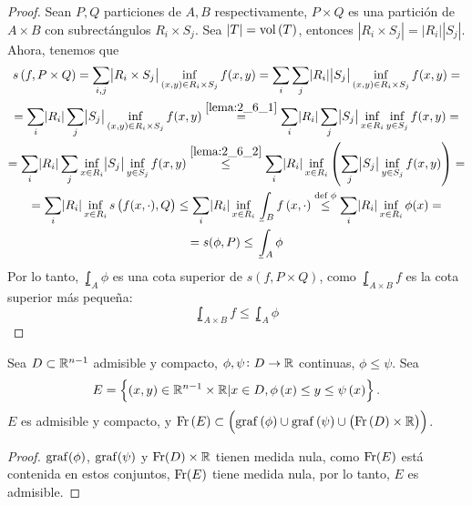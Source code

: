\begin{proof}
    Sean $P, Q$ particiones de $A, B$ respectivamente, $P\times Q$ es una partición de $A\times B$ con subrectángulos $R_i \times S_j$. Sea $|T| = \operatorname{vol}\left( T\right)$, entonces $|R_i\times S_j| = |R_i||S_j|$. Ahora, tenemos que
    \begin{gather*}
        s\left( f, P \times Q \right) = \sum_{i,j} \abs{R_i \times S_j} \inf_{(x, y)
        \in R_i \times S_j} f(x, y) = \sum_i \sum_j \abs{R_i} \abs{S_j} \inf_{(x, y)
        \in R_i \times S_j} f(x, y) =\\= \sum_i \abs{R_i} \sum_j \abs{S_j} \inf_{(x, y)
        \in R_i \times S_j} f(x, y) \stackrel{\ref{lema:2_6_1}}{=} \sum_i \abs{R_i}
        \sum_j \abs{S_j} \inf_{x \in R_i} \inf_{y \in S_j} f(x, y) = \\ =
        \sum_i \abs{R_i} \sum_j \inf_{x \in R_i} \abs{S_j} \inf_{y \in S_j} f(x, y)
        \stackrel{\ref{lema:2_6_2}}{\leq} \sum_i \abs{R_i} \inf_{x \in R_i} \left(
        \sum_j \abs{S_j} \inf_{y \in S_j} f(x, y)\right) =\\= \sum_i \abs{R_i}
        \inf_{x \in R_i} s\left( f(x, \cdot), Q \right) \leq \sum_i \abs{R_i}
        \inf_{x \in R_i} \lowint_B f\left( x, \cdot \right) \stackrel{\text{def } \phi}
        {\leq} \sum_i \abs{R_i} \inf_{x \in R_i} \phi(x) =\\= s(\phi, P) \leq
        \lowint_A \phi
    \end{gather*}
    Por lo tanto, $\lowint_A \phi$ es una cota superior de $s\left( f, P \times Q
    \right)$, como $\lowint_{A \times B} f$ es la cota superior más pequeña:
    \[
        \lowint_{A \times B} f \leq \lowint_A \phi
    \]
\end{proof}
\begin{lema}
    Sea $D \subset \mathbb{R}^{n-1}$ admisible y compacto, $\phi, \psi \colon D \to \mathbb{R}$ continuas, $\phi \leq \psi$. Sea
    \[ E = \left\{\left( x,y\right) \in \mathbb{R}^{n-1} \times \mathbb{R} | x\in D, \phi\left( x\right) \leq y \leq \psi\left( x\right) \right\}. \]
    $E$ es admisible y compacto, y $\operatorname{Fr}\left( E\right) \subset \left( \operatorname{graf}\left(\phi\right) \cup \operatorname{graf}\left(\psi\right)\cup\left( \operatorname{Fr}\left( D\right)\times\mathbb{R}\right) \right)$.
\end{lema}

\begin{proof}
    $\operatorname{graf} (\phi)$, $\operatorname{graf}(\psi)$ y $\operatorname{Fr}(D) \times \mathbb{R}$ tienen medida nula, como
    $\operatorname{Fr}(E)$ está contenida en estos conjuntos, $\operatorname{Fr}(E)$ tiene medida nula, por lo
    tanto, $E$ es admisible.
\end{proof}

